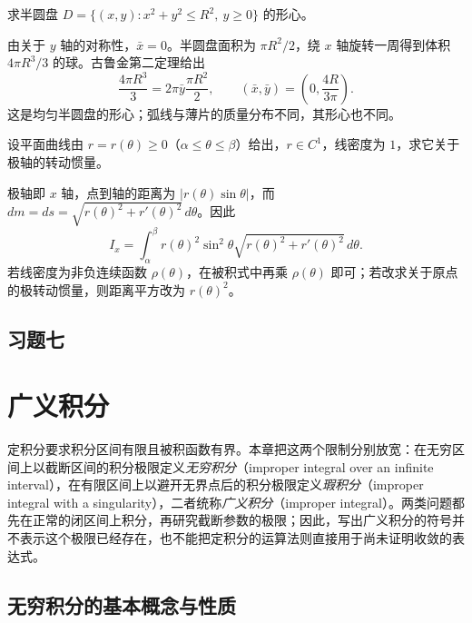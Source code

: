\documentclass[UTF8,12pt,a4paper,fontset=fandol]{ctexbook}
\begin{document}
\begin{example}
\label{ex:semidisk-centroid}
求半圆盘 $D=\{(x,y):x^2+y^2\leq R^2,\ y\geq0\}$ 的形心。
\end{example}
\begin{solve}
由关于 $y$ 轴的对称性，$\bar x=0$。半圆盘面积为 $\pi R^2/2$，绕 $x$ 轴旋转一周得到体积 $4\pi R^3/3$ 的球。古鲁金第二定理给出
\[
    \frac{4\pi R^3}{3}
    =2\pi\bar y\frac{\pi R^2}{2},
    \qquad
    (\bar x,\bar y)=\left(0,\frac{4R}{3\pi}\right).
\]
这是均匀半圆盘的形心；弧线与薄片的质量分布不同，其形心也不同。
\end{solve}

\begin{example}
\label{ex:polar-wire-moment-of-inertia}
设平面曲线由 $r=r(\theta)\geq0$（$\alpha\leq\theta\leq\beta$）给出，$r\in C^1$，线密度为 $1$，求它关于极轴的转动惯量。
\end{example}
\begin{solve}
极轴即 $x$ 轴，点到轴的距离为 $|r(\theta)\sin\theta|$，而 $dm=ds=\sqrt{r(\theta)^2+r'(\theta)^2}\,d\theta$。因此
\[
    I_x=\int_\alpha^\beta
    r(\theta)^2\sin^2\theta
    \sqrt{r(\theta)^2+r'(\theta)^2}\,d\theta.
\]
若线密度为非负连续函数 $\rho(\theta)$，在被积式中再乘 $\rho(\theta)$ 即可；若改求关于原点的极转动惯量，则距离平方改为 $r(\theta)^2$。
\end{solve}

\section*{习题七}

\chapter{广义积分}
\label{chap:improper-integrals}

定积分要求积分区间有限且被积函数有界。本章把这两个限制分别放宽：在无穷区间上以截断区间的积分极限定义\emph{无穷积分}（improper integral over an infinite interval），在有限区间上以避开无界点后的积分极限定义\emph{瑕积分}（improper integral with a singularity），二者统称\emph{广义积分}（improper integral）。两类问题都先在正常的闭区间上积分，再研究截断参数的极限；因此，写出广义积分的符号并不表示这个极限已经存在，也不能把定积分的运算法则直接用于尚未证明收敛的表达式。

\section{无穷积分的基本概念与性质}
\label{sec:infinite-integrals-concepts-and-properties}
\end{document}

